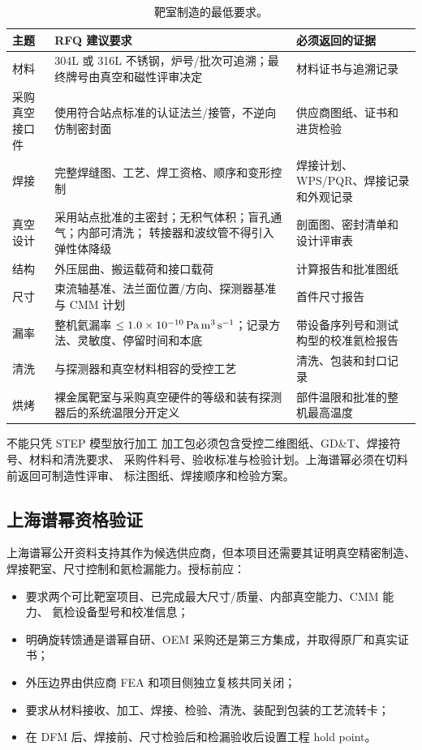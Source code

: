 \documentclass[UTF8,10pt,letterpaper,fontset=none]{ctexart}
\begin{document}
\begin{table}[htbp]
  \centering
  \scriptsize
  \caption{靶室制造的最低要求。}
  \begin{tabularx}{\textwidth}{L{0.18\textwidth}Y Y}
    \toprule
    主题 & RFQ 建议要求 & 必须返回的证据 \\
    \midrule
    材料 & 304L 或 316L 不锈钢，炉号/批次可追溯；最终牌号由真空和磁性评审决定 &
      材料证书与追溯记录 \\
    采购真空接口件 & 使用符合站点标准的认证法兰/接管，不逆向仿制密封面 &
      供应商图纸、证书和进货检验 \\
    焊接 & 完整焊缝图、工艺、焊工资格、顺序和变形控制 &
      焊接计划、WPS/PQR、焊接记录和外观记录 \\
    真空设计 & 采用站点批准的主密封；无积气体积；盲孔通气；内部可清洗；
      转接器和波纹管不得引入弹性体降级 &
      剖面图、密封清单和设计评审表 \\
    结构 & 外压屈曲、搬运载荷和接口载荷 &
      计算报告和批准图纸 \\
    尺寸 & 束流轴基准、法兰面位置/方向、探测器基准与 CMM 计划 &
      首件尺寸报告 \\
    漏率 & 整机氦漏率 $\leq
      1.0\times10^{-10}\,
      \si{\pascal\meter\cubed\per\second}$；记录方法、灵敏度、停留时间和本底 &
      带设备序列号和测试构型的校准氦检报告 \\
    清洗 & 与探测器和真空材料相容的受控工艺 &
      清洗、包装和封口记录 \\
    烘烤 & 裸金属靶室与采购真空硬件的等级和装有探测器后的系统温限分开定义 &
      部件温限和批准的整机最高温度 \\
    \bottomrule
  \end{tabularx}
\end{table}

\begin{notebox}{不能只凭 STEP 模型放行加工}
  加工包必须包含受控二维图纸、GD\&T、焊接符号、材料和清洗要求、
  采购件料号、验收标准与检验计划。上海谱幂必须在切料前返回可制造性评审、
  标注图纸、焊接顺序和检验方案。
\end{notebox}

\subsection{上海谱幂资格验证}

上海谱幂公开资料支持其作为候选供应商，但本项目还需要其证明真空精密制造、
焊接靶室、尺寸控制和氦检漏能力。授标前应：
\begin{itemize}
  \item 要求两个可比靶室项目、已完成最大尺寸/质量、内部真空能力、CMM 能力、
    氦检设备型号和校准信息；
  \item 明确旋转馈通是谱幂自研、OEM 采购还是第三方集成，并取得原厂和真实证书；
  \item 外压边界由供应商 FEA 和项目侧独立复核共同关闭；
  \item 要求从材料接收、加工、焊接、检验、清洗、装配到包装的工艺流转卡；
  \item 在 DFM 后、焊接前、尺寸检验后和检漏验收后设置工程 hold point。
\end{itemize}
\end{document}
